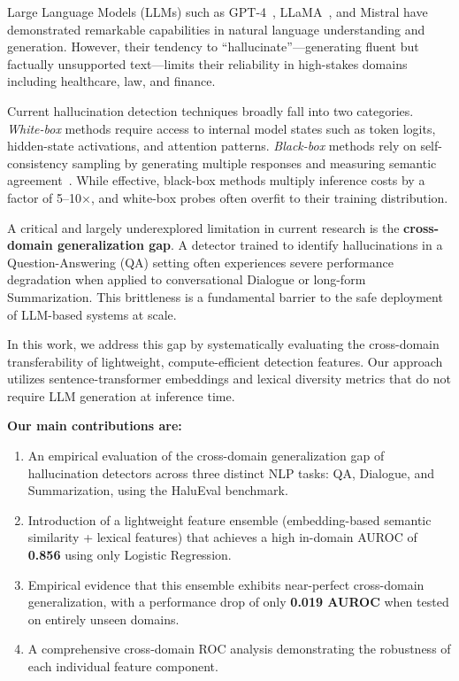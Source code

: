 \documentclass[conference]{IEEEtran}
\begin{document}
Large Language Models (LLMs) such as GPT-4~\cite{openai2023}, LLaMA~\cite{touvron2023}, and Mistral have demonstrated remarkable capabilities in natural language understanding and generation. However, their tendency to ``hallucinate''—generating fluent but factually unsupported text—limits their reliability in high-stakes domains including healthcare, law, and finance.

Current hallucination detection techniques broadly fall into two categories. \textit{White-box} methods require access to internal model states such as token logits, hidden-state activations, and attention patterns. \textit{Black-box} methods rely on self-consistency sampling by generating multiple responses and measuring semantic agreement~\cite{manakul2023selfcheck}. While effective, black-box methods multiply inference costs by a factor of 5–10$\times$, and white-box probes often overfit to their training distribution.

A critical and largely underexplored limitation in current research is the \textbf{cross-domain generalization gap}. A detector trained to identify hallucinations in a Question-Answering (QA) setting often experiences severe performance degradation when applied to conversational Dialogue or long-form Summarization. This brittleness is a fundamental barrier to the safe deployment of LLM-based systems at scale.

In this work, we address this gap by systematically evaluating the cross-domain transferability of lightweight, compute-efficient detection features. Our approach utilizes sentence-transformer embeddings and lexical diversity metrics that do not require LLM generation at inference time.

\textbf{Our main contributions are:}
\begin{enumerate}
    \item An empirical evaluation of the cross-domain generalization gap of hallucination detectors across three distinct NLP tasks: QA, Dialogue, and Summarization, using the HaluEval benchmark.
    \item Introduction of a lightweight feature ensemble (embedding-based semantic similarity + lexical features) that achieves a high in-domain AUROC of \textbf{0.856} using only Logistic Regression.
    \item Empirical evidence that this ensemble exhibits near-perfect cross-domain generalization, with a performance drop of only \textbf{0.019 AUROC} when tested on entirely unseen domains.
    \item A comprehensive cross-domain ROC analysis demonstrating the robustness of each individual feature component.
\end{enumerate}
\end{document}
